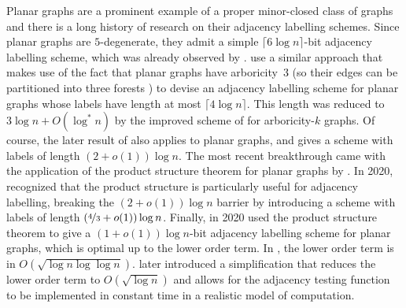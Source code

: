 \documentclass[twoside,leqno]{article}
\newcommand{\Oh}{O}
\begin{document}
Planar graphs are a prominent example of a proper minor-closed class of graphs and there is a long history of research
on their adjacency labelling schemes.
Since planar graphs are $5$-degenerate,
they admit a simple $\lceil6\log n\rceil$-bit adjacency labelling scheme, which was already observed by \citet{muller:local}.
\citet{kannan.naor.ea:implicit} use a similar approach that makes use of the fact that planar graphs have arboricity~3 (so their edges can be partitioned into three forests \citep{nash-williams:edge-disjoint}) to devise an adjacency labelling scheme for planar graphs whose labels have length at most $\lceil4\log n\rceil$. This length was reduced to $3\log{n} + \Oh(\log^*{n})$ by the improved scheme of \citet{AR02} for arboricity-$k$ graphs. 
Of course, the later result of \citet{gavoille.labourel:shorter} also applies to planar graphs, and gives a scheme with labels of length $(2+o(1))\log n$.
The most recent breakthrough came with the application of the product structure theorem for planar graphs by \citet{dujmovic.joret.ea:planar}.
In 2020, \citet{BGP22} recognized that the product structure is particularly useful for adjacency labelling, breaking the $(2+o(1))\log n$  barrier by introducing a scheme with labels of length $(\nicefrac{4}{3}+o(1))\log n$.
Finally, in 2020 \citet{dujmovic.esperet.ea:adjacency} used the product structure theorem to give a $(1+o(1))\log n$-bit adjacency labelling scheme for planar graphs, which is optimal up to the lower order term. In \citet{dujmovic.esperet.ea:adjacency}, the lower order term is in $\Oh(\sqrt{\log n\log\log n})$.  \citet{gawrychowski.janczewski:simpler} later introduced a simplification that reduces the lower order term to  $\Oh(\sqrt{\log n})$ and allows for the adjacency testing function to be implemented in constant time in a realistic model of computation.
\end{document}
